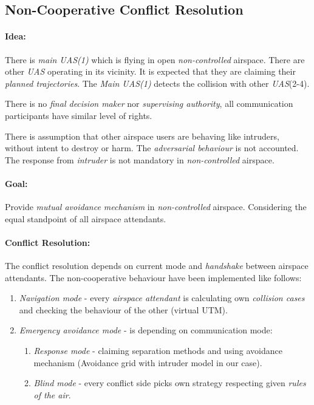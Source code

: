 \subsection{Non-Cooperative Conflict Resolution}\label{sec:nonCooperativeConflictResolution}

\paragraph{Idea:} There is \emph{main UAS(1)} which is flying in open \emph{non-controlled} airspace. There are other \emph{UAS} operating in its vicinity. It is expected that they are claiming their \emph{planned trajectories}. The \emph{Main UAS(1)} detects the collision with other \emph{UAS}(2-4).

There is no \emph{final decision maker} nor \emph{supervising authority}, all communication participants have similar level of rights. 
\begin{note}
    There is assumption that other airspace users are behaving like intruders, without intent to destroy or harm. The \emph{adversarial behaviour} is not accounted. The response from \emph{intruder} is not mandatory in \emph{non-controlled} airspace.
\end{note}

\paragraph{Goal:} Provide \emph{mutual avoidance mechanism} in \emph{non-controlled} airspace. Considering the equal standpoint of all airspace attendants.

\paragraph{Conflict Resolution:} The conflict resolution depends on current mode and \emph{handshake} between airspace attendants. The non-cooperative behaviour have been implemented like follows:

\begin{enumerate}
    \item\emph{Navigation mode} - every \emph{airspace attendant} is calculating own \emph{collision cases} and checking the behaviour of the other (virtual UTM).
    
    \item\emph{Emergency avoidance mode} - is depending on communication mode:
    \begin{enumerate}[a]
        \item\emph{Response mode} - claiming separation methods and using avoidance mechanism (Avoidance grid with intruder model in our case).
        
        \item\emph{Blind mode} - every conflict side picks own strategy respecting given \emph{rules of the air}.
    \end{enumerate}
\end{enumerate}


